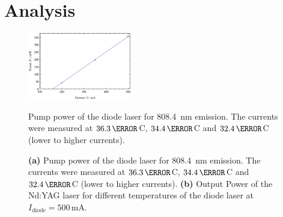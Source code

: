 \documentclass[a4paper]{scrartcl}
\numberwithin{equation}{section}
\numberwithin{figure}{section}
\numberwithin{table}{section}
\begin{document}
\section{Analysis}
\begin{figure}[!h]
\centering
\includegraphics[width=0.4\textwidth]{img/PvsI808.pdf}
\caption{ \small  Pump power of the diode laser for \SI{808.4}{nm} emission. The currents were measured at $36.3\,\degree$C, $34.4\,\degree$C and $32.4\,\degree$C (lower to higher currents). }
\label{fig:cal}

\centering
{}
\hfill
{}
\caption{\small \textbf{(a)} Pump power of the diode laser for \SI{808.4}{nm} emission. The currents were measured at $36.3\,\degree$C, $34.4\,\degree$C and $32.4\,\degree$C (lower to higher currents). \textbf{(b)} Output Power of the Nd:YAG laser for different temperatures of the diode laser at $I_\text{diode}=500\,\text{mA}$.}
\label{fig:power}
\end{figure}
\end{document}
